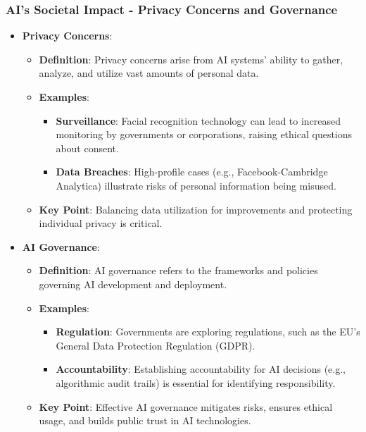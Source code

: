 \documentclass{beamer}
\begin{document}
\begin{frame}[fragile]
    \frametitle{AI's Societal Impact - Privacy Concerns and Governance}
    \begin{itemize}
        \item \textbf{Privacy Concerns}:
            \begin{itemize}
                \item \textbf{Definition}: Privacy concerns arise from AI systems' ability to gather, analyze, and utilize vast amounts of personal data.
                \item \textbf{Examples}:
                    \begin{itemize}
                        \item \textbf{Surveillance}: Facial recognition technology can lead to increased monitoring by governments or corporations, raising ethical questions about consent.
                        \item \textbf{Data Breaches}: High-profile cases (e.g., Facebook-Cambridge Analytica) illustrate risks of personal information being misused.
                    \end{itemize}
                \item \textbf{Key Point}: Balancing data utilization for improvements and protecting individual privacy is critical.
            \end{itemize}
            
        \item \textbf{AI Governance}:
            \begin{itemize}
                \item \textbf{Definition}: AI governance refers to the frameworks and policies governing AI development and deployment.
                \item \textbf{Examples}:
                    \begin{itemize}
                        \item \textbf{Regulation}: Governments are exploring regulations, such as the EU's General Data Protection Regulation (GDPR).
                        \item \textbf{Accountability}: Establishing accountability for AI decisions (e.g., algorithmic audit trails) is essential for identifying responsibility.
                    \end{itemize}
                \item \textbf{Key Point}: Effective AI governance mitigates risks, ensures ethical usage, and builds public trust in AI technologies.
            \end{itemize}
    \end{itemize}
\end{frame}
\end{document}
